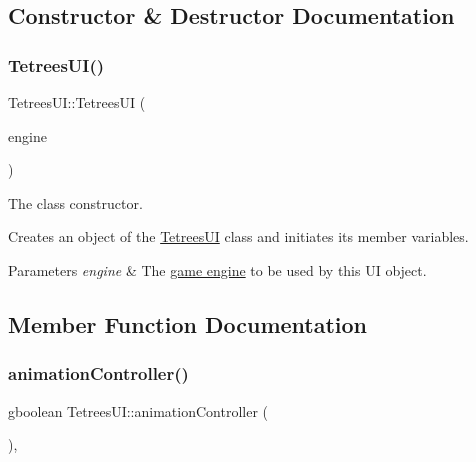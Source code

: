 \subsection{Constructor \& Destructor Documentation}
\mbox{\label{classTetreesUI_ad6a5b91b1574c25c2bcd48601142013c}} 
\subsubsection{\texorpdfstring{Tetrees\+U\+I()}{TetreesUI()}}
{\footnotesize\ttfamily Tetrees\+U\+I\+::\+Tetrees\+UI (\begin{DoxyParamCaption}\item[{\hyperlink{classTetreesEngine}{Tetrees\+Engine}}]{engine }\end{DoxyParamCaption})}



The class constructor. 

Creates an object of the \hyperlink{classTetreesUI}{Tetrees\+UI} class and initiates its member variables. 
\begin{DoxyParams}{Parameters}
{\em engine} & The \hyperlink{classTetreesEngine}{game engine} to be used by this UI object. \\
\hline
\end{DoxyParams}


\subsection{Member Function Documentation}
\mbox{\label{classTetreesUI_adfb21fb6812e45bebe1e6e9b608786a0}} 
\subsubsection{\texorpdfstring{animation\+Controller()}{animationController()}}
{\footnotesize\ttfamily gboolean Tetrees\+U\+I\+::animation\+Controller (\begin{DoxyParamCaption}{ }\end{DoxyParamCaption})\hspace{0.3cm}{\ttfamily [static]}, {\ttfamily [private]}}




